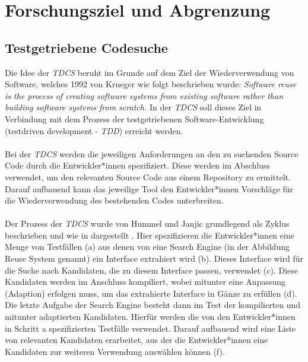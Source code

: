 \chapter{Forschungsziel und Abgrenzung}\label{chap_problem}
\section{Testgetriebene Codesuche}\label{sec_tdcs}
Die Idee der \emph{TDCS} beruht im Grunde auf dem Ziel der Wiederverwendung von Software, welches 1992 von Krueger wie folgt beschrieben wurde:
\emph{\glqq Software reuse is the process of creating software systems from existing software rather than building software systems from scratch.\grqq{}} \cite{krueger} In der \emph{TDCS} soll dieses Ziel in Verbindung mit dem Prozess der testgetriebenen Software-Entwicklung (testdriven development - \emph{TDD}) erreicht werden. \cite{hummel08} 
\\\\
Bei der \emph{TDCS} werden die jeweiligen Anforderungen an den zu suchenden Source Code durch die Entwickler*innen spezifiziert. Diese werden im Abschluss verwendet, um den relevanten Source Code aus einem Repository zu ermittelt. Darauf aufbauend kann das jeweilige Tool den Entwickler*innen Vorschläge für die Wiederverwendung des bestehenden Codes unterbreiten.
\\\\
Der Prozess der \emph{TDCS} wurde von Hummel und Janjic grundlegend als Zyklus beschrieben und wie in  dargestellt  \cite{Hummel2013}.
\noindent
Hier spezifizieren die Entwickler*innen eine Menge von Testfällen (a) aus denen von eine Search \Gls{Engine} (in der Abbildung \glqq Reuse System\grqq{} genannt) ein Interface extrahiert wird (b). Dieses Interface wird für die Suche nach Kandidaten, die zu diesem Interface passen, verwendet (c). Diese Kandidaten werden im Anschluss kompiliert, wobei mitunter eine Anpassung (Adaption) erfolgen muss, um das extrahierte Interface in Gänze zu erfüllen (d). Die letzte Aufgabe der Search \Gls{Engine} besteht dann im Test der kompilierten und mitunter adaptierten Kandidaten. Hierfür werden die von den Entwickler*innen in Schritt a spezifizierten Testfälle verwendet. Darauf aufbauend wird eine Liste von relevanten Kandidaten erarbeitet, aus der die Entwickler*innen eine Kandidaten zur weiteren Verwendung auswählen können (f).
\\\\
